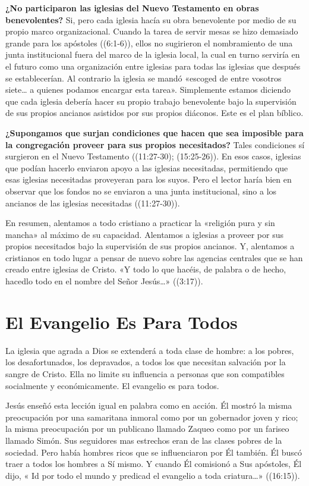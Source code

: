 \documentclass[12pt, twoside, openright]{book}
\begin{document}
\textbf{¿No participaron las iglesias del Nuevo Testamento en obras benevolentes?} Si, pero cada iglesia hacía su obra benevolente por medio de su propio marco organizacional. Cuando la tarea de servir mesas se hizo demasiado grande para los apóstoles ((6:1-6)), ellos no sugirieron el nombramiento de una junta institucional fuera del marco de la iglesia local, la cual en turno serviría en el futuro como una organización entre iglesias para todas las iglesias que después se establecerían. Al contrario la iglesia se mandó «escoged de entre vosotros siete… a quienes podamos encargar esta tarea». Simplemente estamos diciendo que cada iglesia debería hacer su propio trabajo benevolente bajo la supervisión de sus propios ancianos asistidos por sus propios diáconos. Este es el plan bíblico.

\textbf{¿Supongamos que surjan condiciones que hacen que sea imposible para la congregación proveer para sus propios necesitados?} Tales condiciones sí surgieron en el Nuevo Testamento ((11:27-30); (15:25-26)). En esos casos, iglesias que podían hacerlo enviaron apoyo a las iglesias necesitadas, permitiendo que esas iglesias necesitadas proveyeran para los suyos. Pero el lector haría bien en observar que los fondos no se enviaron a una junta institucional, sino a los ancianos de las iglesias necesitadas ((11:27-30)). 

En resumen, alentamos a todo cristiano a practicar la «religión pura y sin mancha» al máximo de su capacidad. Alentamos a iglesias a proveer por sus propios necesitados bajo la supervisión de sus propios ancianos. Y, alentamos a cristianos en todo lugar a pensar de nuevo sobre las agencias centrales que se han creado entre iglesias de Cristo. «Y todo lo que hacéis, de palabra o de hecho, hacedlo todo en el nombre del Señor Jesús…» ((3:17)).

\section{El Evangelio Es Para Todos}
La iglesia que agrada a Dios se extenderá a toda clase de hombre: a los pobres, los desafortunados, los depravados, a todos los que necesitan salvación por la sangre de Cristo. Ella no limite su influencia a personas que son compatibles socialmente y económicamente. El evangelio es para todos.

Jesús enseñó esta lección igual en palabra como en acción. Él mostró la misma preocupación por una samaritana inmoral como por un gobernador joven y rico; la misma preocupación por un publicano llamado Zaqueo como por un fariseo llamado Simón. Sus seguidores mas estrechos eran de las clases pobres de la sociedad. Pero había hombres ricos que se influenciaron por Él también. Él buscó traer a todos los hombres a Sí mismo. Y cuando Él comisionó a Sus apóstoles, Él dijo, « Id por todo el mundo y predicad el evangelio a toda criatura…» ((16:15)).
\end{document}

